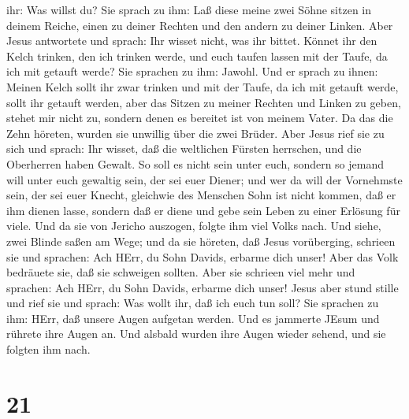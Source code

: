 ihr: Was willst du? Sie sprach zu ihm: Laß diese meine zwei Söhne sitzen
in deinem Reiche, einen zu deiner Rechten und den andern zu deiner
Linken.  Aber Jesus antwortete und sprach: Ihr wisset
nicht, was ihr bittet. Könnet ihr den Kelch trinken, den ich trinken
werde, und euch taufen lassen mit der Taufe, da ich mit getauft werde?
Sie sprachen zu ihm: Jawohl.  Und er sprach zu ihnen:
Meinen Kelch sollt ihr zwar trinken und mit der Taufe, da ich mit
getauft werde, sollt ihr getauft werden, aber das Sitzen zu meiner
Rechten und Linken zu geben, stehet mir nicht zu, sondern denen es
bereitet ist von meinem Vater.  Da das die Zehn höreten,
wurden sie unwillig über die zwei Brüder.  Aber Jesus rief
sie zu sich und sprach: Ihr wisset, daß die weltlichen Fürsten
herrschen, und die Oberherren haben Gewalt.  So soll es
nicht sein unter euch, sondern so jemand will unter euch gewaltig sein,
der sei euer Diener;  und wer da will der Vornehmste sein,
der sei euer Knecht,  gleichwie des Menschen Sohn ist nicht
kommen, daß er ihm dienen lasse, sondern daß er diene und gebe sein
Leben zu einer Erlösung für viele.  Und da sie von Jericho
auszogen, folgte ihm viel Volks nach.  Und siehe, zwei
Blinde saßen am Wege; und da sie höreten, daß Jesus vorüberging,
schrieen sie und sprachen: Ach HErr, du Sohn Davids, erbarme dich unser!
 Aber das Volk bedräuete sie, daß sie schweigen sollten.
Aber sie schrieen viel mehr und sprachen: Ach HErr, du Sohn Davids,
erbarme dich unser!  Jesus aber stund stille und rief sie
und sprach: Was wollt ihr, daß ich euch tun soll?  Sie
sprachen zu ihm: HErr, daß unsere Augen aufgetan werden. 
Und es jammerte JEsum und rührete ihre Augen an. Und alsbald wurden ihre
Augen wieder sehend, und sie folgten ihm nach.

\hypertarget{section-20}{%
\section{21}\label{section-20}}

